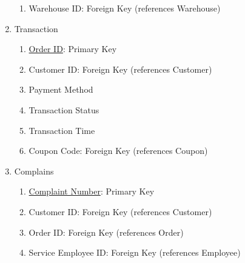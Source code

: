 \documentclass[12pt]{report}
\begin{document}
\begin{enumerate}
\begin{enumerate}
                \item Warehouse ID: Foreign Key (references Warehouse)
            \end{enumerate}
            \item Transaction
            \begin{enumerate}
                \item \underline{Order ID}: Primary Key
                \item Customer ID: Foreign Key (references Customer)
                \item Payment Method
                \item Transaction Status
                \item Transaction Time
                \item Coupon Code: Foreign Key (references Coupon)
            \end{enumerate}
            \item Complains
            \begin{enumerate}
                \item \underline {Complaint Number}: Primary Key
                \item Customer ID: Foreign Key (references Customer)
                \item Order ID: Foreign Key (references Order)
                \item Service Employee ID: Foreign Key (references Employee)
            \end{enumerate}
        \end{enumerate}
    \
\end{document}
